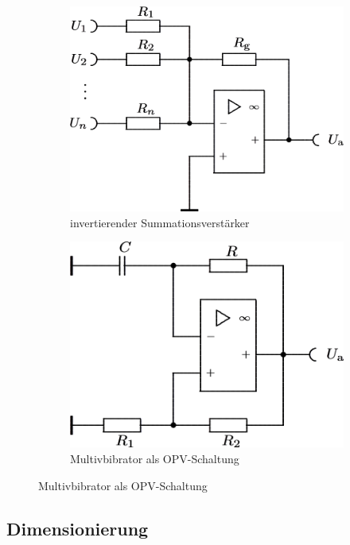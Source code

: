 \documentclass[numbers=noenddot,12pt,a4paper]{scrartcl}
\begin{document}
\begin{figure}[H]
\begin{subfigure}[b]{0.48\textwidth}
\includegraphics[width=\textwidth]{summation.png}
\caption{invertierender Summationsverstärker} \label{img:summ}
\end{subfigure}
\begin{subfigure}[b]{0.48\textwidth}
\includegraphics[width=\textwidth]{multivib.png}
\caption{Multivbibrator als OPV-Schaltung} \label{img:multi}
\end{subfigure}
\end{figure}
\subsection{Dimensionierung} \label{subsec:dim}
\end{document}
